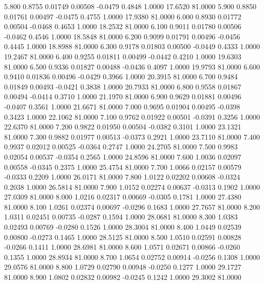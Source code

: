    5.800   0.8755   0.01749   0.00508  -0.0479   0.4848   1.0000  17.6520  81.0000
   5.900   0.8850   0.01761   0.00497  -0.0475   0.4755   1.0000  17.9380  81.0000
   6.000   0.8930   0.01772   0.00504  -0.0468   0.4653   1.0000  18.2532  81.0000
   6.100   0.9011   0.01780   0.00506  -0.0462   0.4546   1.0000  18.5848  81.0000
   6.200   0.9099   0.01791   0.00496  -0.0456   0.4445   1.0000  18.8988  81.0000
   6.300   0.9178   0.01803   0.00500  -0.0449   0.4333   1.0000  19.2467  81.0000
   6.400   0.9255   0.01811   0.00499  -0.0442   0.4210   1.0000  19.6303  81.0000
   6.500   0.9336   0.01827   0.00488  -0.0436   0.4097   1.0000  19.9793  81.0000
   6.600   0.9410   0.01836   0.00496  -0.0429   0.3966   1.0000  20.3915  81.0000
   6.700   0.9484   0.01849   0.00493  -0.0421   0.3838   1.0000  20.7933  81.0000
   6.800   0.9558   0.01867   0.00494  -0.0414   0.3710   1.0000  21.1970  81.0000
   6.900   0.9629   0.01881   0.00496  -0.0407   0.3561   1.0000  21.6671  81.0000
   7.000   0.9695   0.01904   0.00495  -0.0398   0.3423   1.0000  22.1062  81.0000
   7.100   0.9762   0.01922   0.00501  -0.0391   0.3256   1.0000  22.6370  81.0000
   7.200   0.9822   0.01950   0.00504  -0.0382   0.3101   1.0000  23.1321  81.0000
   7.300   0.9882   0.01977   0.00513  -0.0373   0.2921   1.0000  23.7110  81.0000
   7.400   0.9937   0.02012   0.00525  -0.0364   0.2747   1.0000  24.2705  81.0000
   7.500   0.9983   0.02054   0.00537  -0.0354   0.2565   1.0000  24.8596  81.0000
   7.600   1.0036   0.02097   0.00558  -0.0345   0.2375   1.0000  25.4754  81.0000
   7.700   1.0066   0.02157   0.00579  -0.0333   0.2209   1.0000  26.0171  81.0000
   7.800   1.0122   0.02202   0.00608  -0.0324   0.2038   1.0000  26.5814  81.0000
   7.900   1.0152   0.02274   0.00637  -0.0313   0.1902   1.0000  27.0309  81.0000
   8.000   1.0216   0.02317   0.00669  -0.0305   0.1781   1.0000  27.4380  81.0000
   8.100   1.0261   0.02374   0.00697  -0.0296   0.1683   1.0000  27.7657  81.0000
   8.200   1.0311   0.02451   0.00735  -0.0287   0.1594   1.0000  28.0681  81.0000
   8.300   1.0383   0.02493   0.00769  -0.0280   0.1526   1.0000  28.3004  81.0000
   8.400   1.0449   0.02539   0.00800  -0.0273   0.1465   1.0000  28.5125  81.0000
   8.500   1.0510   0.02591   0.00828  -0.0266   0.1411   1.0000  28.6981  81.0000
   8.600   1.0571   0.02671   0.00866  -0.0260   0.1355   1.0000  28.8934  81.0000
   8.700   1.0654   0.02752   0.00914  -0.0256   0.1308   1.0000  29.0576  81.0000
   8.800   1.0729   0.02790   0.00948  -0.0250   0.1277   1.0000  29.1727  81.0000
   8.900   1.0802   0.02832   0.00982  -0.0245   0.1242   1.0000  29.3002  81.0000
